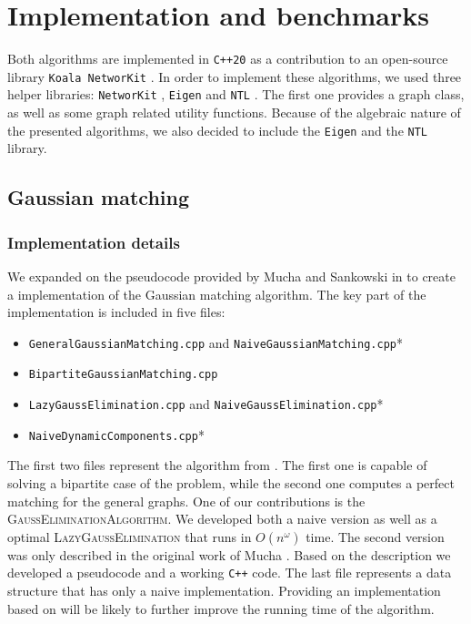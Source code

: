 \chapter{Implementation and benchmarks}

Both algorithms are implemented in \texttt{C++20} as a contribution to an open-source library \texttt{Koala NetworKit} \cite{koala_networkit}. In order to implement these algorithms, we used three helper libraries: \texttt{NetworKit} \cite{networkit}, \texttt{Eigen} \cite{eigen} and \texttt{NTL} \cite{ntl}. The first one provides a graph class, as well as some graph related utility functions. Because of the algebraic nature of the presented algorithms, we also decided to include the \texttt{Eigen} and the \texttt{NTL} library.

\section{Gaussian matching}
\subsection{Implementation details}
We expanded on the pseudocode provided by Mucha and Sankowski in \cite{mucha} to create a implementation of the Gaussian matching algorithm. The key part of the implementation is included in five files:
\begin{itemize}
    \item \texttt{GeneralGaussianMatching.cpp} and \texttt{NaiveGaussianMatching.cpp}*
    \item \texttt{BipartiteGaussianMatching.cpp}
    \item \texttt{LazyGaussElimination.cpp} and \texttt{NaiveGaussElimination.cpp}*
    \item \texttt{NaiveDynamicComponents.cpp}*
\end{itemize}

The first two files represent the algorithm from \cite{mucha}. The first one is capable of solving a bipartite case of the problem, while the second one computes a perfect matching for the general graphs. One of our contributions is the \textsc{GaussEliminationAlgorithm}. We developed both a naive version as well as a optimal \textsc{LazyGaussElimination} that runs in $O(n^\omega)$ time. The second version was only described in the original work of Mucha \cite{mucha}. Based on the description we developed a pseudocode and a working \texttt{C++} code.
The last file represents a data structure that has only a naive implementation. Providing an implementation based on \cite{dynamic_components} will be likely to further improve the running time of the algorithm. 

